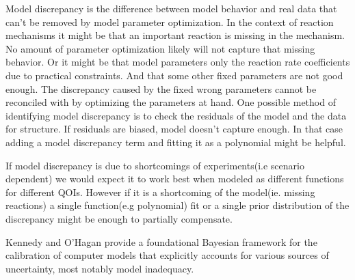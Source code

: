 Model discrepancy is the difference between model behavior and real data that can't be removed by model parameter optimization. In the context of reaction mechanisms it might be that an important reaction is missing in the mechanism. No amount of parameter optimization likely will not capture that missing behavior. Or it might be that model parameters only the reaction rate coefficients due to practical constraints. And that some other fixed parameters are not good enough. The discrepancy caused by the fixed wrong parameters cannot be reconciled with by optimizing the parameters at hand. One possible method of identifying model discrepancy is to check the residuals of the model and the data for structure. If residuals are biased, model doesn't capture enough. In that case adding a model discrepancy term and fitting it as a polynomial might be helpful. \cite{smith_uncertainty_2024}

If model discrepancy is due to shortcomings of experiments(i.e scenario dependent) we would expect it to work best when modeled as different functions for different QOIs. However if it is a shortcoming of the model(ie. missing reactions) a  single function(e.g polynomial) fit or a single prior distribution of the discrepancy might be enough to partially compensate. 

Kennedy and O'Hagan\cite{kennedy_bayesian_2001} provide a foundational Bayesian framework for the calibration of computer models that explicitly accounts for various sources of uncertainty, most notably model inadequacy.


